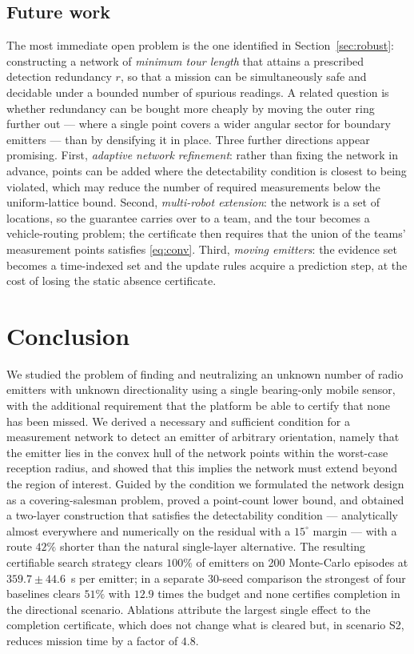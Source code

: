 \documentclass[preprint,12pt,3p]{elsarticle}
\theoremstyle{definition}
\begin{document}
\subsection{Future work}
The most immediate open problem is the one identified in
Section~\ref{sec:robust}: constructing a network of \emph{minimum tour length} that attains a
prescribed detection redundancy $r$, so that a mission can be simultaneously safe and decidable
under a bounded number of spurious readings. A related question is whether redundancy can be
bought more cheaply by moving the outer ring further out --- where a single point covers a wider
angular sector for boundary emitters --- than by densifying it in place.
Three further directions appear promising. First, \emph{adaptive network refinement}: rather than
fixing the network in advance, points can be added where the detectability condition is closest to
being violated, which may reduce the number of required measurements below the uniform-lattice
bound. Second, \emph{multi-robot extension}: the network is a set of locations, so the guarantee
carries over to a team, and the tour becomes a vehicle-routing problem; the certificate then
requires that the union of the teams' measurement points satisfies \eqref{eq:conv}. Third,
\emph{moving emitters}: the evidence set becomes a time-indexed set and the update rules acquire a
prediction step, at the cost of losing the static absence certificate.

\section{Conclusion}
We studied the problem of finding and neutralizing an unknown number of radio emitters with
unknown directionality using a single bearing-only mobile sensor, with the additional
requirement that the platform be able to certify that none has been missed. We derived a
necessary and sufficient condition for a measurement network to detect an emitter of arbitrary
orientation, namely that the emitter lies in the convex hull of the network points within the
worst-case reception radius, and showed that this implies the network must extend beyond the region
of interest. Guided by the condition we formulated the network design as a covering-salesman
problem, proved a point-count lower bound, and obtained a two-layer construction that satisfies the detectability condition --- analytically almost everywhere and numerically on the residual with a $15^\circ$ margin --- with a route $42\%$ shorter than the natural single-layer alternative. The resulting
certifiable search strategy clears $100\%$ of emitters on 200 Monte-Carlo episodes at
$359.7\pm44.6$~s per emitter; in a separate $30$-seed comparison the strongest of four baselines
clears $51\%$ with $12.9$ times the budget and none
certifies completion in the directional scenario. Ablations attribute the largest single effect to
the completion certificate, which does not change what is cleared but, in scenario S2, reduces
mission time by a factor of $4.8$.
\end{document}
